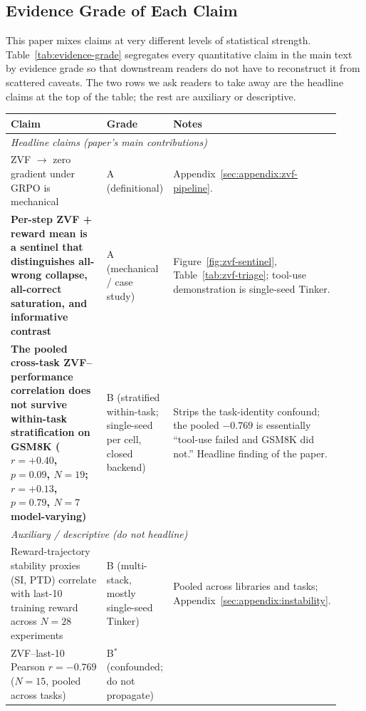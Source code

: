 \documentclass{article}
\begin{document}
\subsection{Evidence Grade of Each Claim}
\label{sec:evidence-grade}
This paper mixes claims at very different levels of statistical strength.
Table~\ref{tab:evidence-grade} segregates every quantitative claim in the
main text by evidence grade so that downstream readers do not have to
reconstruct it from scattered caveats. The two rows we ask readers to take
away are the headline claims at the top of the table; the rest are
auxiliary or descriptive.

\begin{table}[htbp]
\centering\small
\setlength{\tabcolsep}{4pt}
\begin{tabular}{p{0.42\linewidth}p{0.18\linewidth}p{0.32\linewidth}}
\toprule
\textbf{Claim} & \textbf{Grade} & \textbf{Notes} \\
\midrule
\multicolumn{3}{l}{\textit{Headline claims (paper's main contributions)}} \\
\midrule
ZVF $\to$ zero gradient under GRPO is mechanical &
A (definitional) &
Appendix~\ref{sec:appendix:zvf-pipeline}. \\
\textbf{Per-step ZVF + reward mean is a sentinel that distinguishes
all-wrong collapse, all-correct saturation, and informative contrast} &
A (mechanical / case study) &
Figure~\ref{fig:zvf-sentinel}, Table~\ref{tab:zvf-triage}; tool-use
demonstration is single-seed Tinker. \\
\textbf{The pooled cross-task ZVF--performance correlation does not
survive within-task stratification on GSM8K
($r{=}+0.40$, $p{=}0.09$, $N{=}19$; $r{=}+0.13$, $p{=}0.79$, $N{=}7$
model-varying)} &
B (stratified within-task; single-seed per cell, closed backend) &
Strips the task-identity confound; the pooled $-0.769$ is essentially
``tool-use failed and GSM8K did not.'' Headline finding of the paper. \\
\midrule
\multicolumn{3}{l}{\textit{Auxiliary / descriptive (do not headline)}} \\
\midrule
Reward-trajectory stability proxies (SI, PTD) correlate with last-10
training reward across $N{=}28$ experiments &
B (multi-stack, mostly single-seed Tinker) &
Pooled across libraries and tasks; Appendix~\ref{sec:appendix:instability}. \\
ZVF--last-10 Pearson $r = -0.769$ ($N{=}15$, pooled across tasks) &
B$^{*}$ (confounded; do not propagate) &

\end{tabular}
\end{table}
\end{document}
